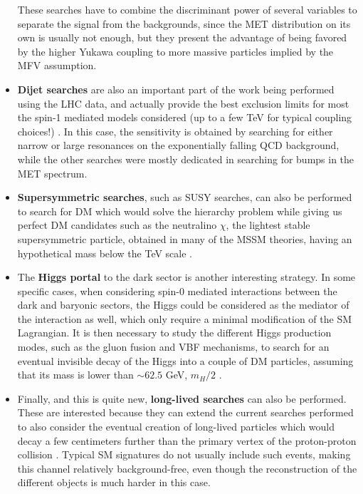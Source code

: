 \documentclass[a4paper, 10pt, openright]{report}
\begin{document}
\begin{itemize}
These searches have to combine the discriminant power of several variables to separate the signal from the backgrounds, since the \ac{MET} distribution on its own is usually not enough, but they present the advantage of being favored by the higher Yukawa coupling to more massive particles implied by the \ac{MFV} assumption.

\item \textbf{Dijet searches} are also an important part of the work being performed using the \ac{LHC} data, and actually provide the best exclusion limits for most the spin-1 mediated models considered (up to a few TeV for typical coupling choices!) \cite{DijetAtlas, DijetCMS}. In this case, the sensitivity is obtained by searching for either narrow or large resonances on the exponentially falling QCD background, while the other searches were mostly dedicated in searching for bumps in the \ac{MET} spectrum.
\item \textbf{Supersymmetric searches}, such as SUSY searches, can also be performed to search for \ac{DM} which would solve the hierarchy problem while giving us perfect \ac{DM} candidates such as the neutralino $\chi$, the lightest stable supersymmetric particle, obtained in many of the \ac{MSSM} theories, having an hypothetical mass below the TeV scale \cite{SUSYDM}.
\item The \textbf{Higgs portal} to the dark sector is another interesting strategy. In some specific cases, when considering spin-0 mediated interactions between the dark and baryonic sectors, the Higgs could be considered as the mediator of the interaction as well, which only require a minimal modification of the \ac{SM} Lagrangian. It is then necessary to study the different Higgs production modes, such as the gluon fusion and \ac{VBF} mechanisms, to search for an eventual invisible decay of the Higgs into a couple of \ac{DM} particles, assuming that its mass is lower than $\sim 62.5$ GeV, $m_H/2$ \cite{InvisibleHiggs}.
\item Finally, and this is quite new, \textbf{long-lived searches} can also be performed. These are interested because they can extend the current searches performed to also consider the eventual creation of long-lived particles which would decay a few centimeters further than the primary vertex of the proton-proton collision \cite{LLSearches}. Typical \ac{SM} signatures do not usually include such events, making this channel relatively background-free, even though the reconstruction of the different objects is much harder in this case.
\end{itemize}
\end{document}
